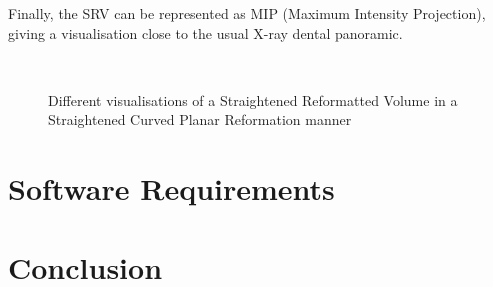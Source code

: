 \documentclass{InsightArticle}
\begin{document}
Finally, the SRV can be represented as MIP (Maximum Intensity Projection), 
giving a visualisation close to the usual X-ray dental panoramic.
%
\begin{figure}
\centering
{}\\
\caption{Different visualisations of a Straightened Reformatted Volume in a
Straightened Curved Planar Reformation manner}
\label{fig:sacpr}
\end{figure}
%
\section{Software Requirements}
%
\section{Conclusion}
%
%
\appendix

%
%



\end{document}
